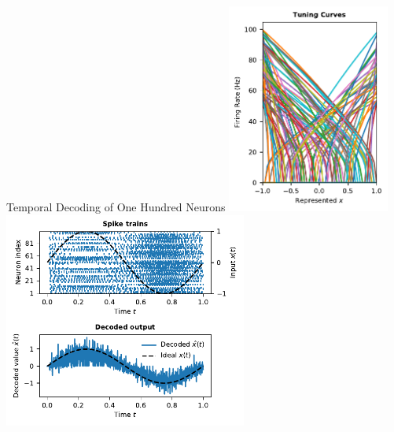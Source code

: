\documentclass[handout,aspectratio=169]{beamer}
\begin{document}
\begin{frame}{Temporal Decoding of One Hundred Neurons}
	\includegraphics[width=0.4\textwidth]{media/hundred_neurons_tuning_curves.pdf}%
	\includegraphics[width=0.6\textwidth]{media/hundred_neurons_spike_train.pdf}
\end{frame}
\end{document}
